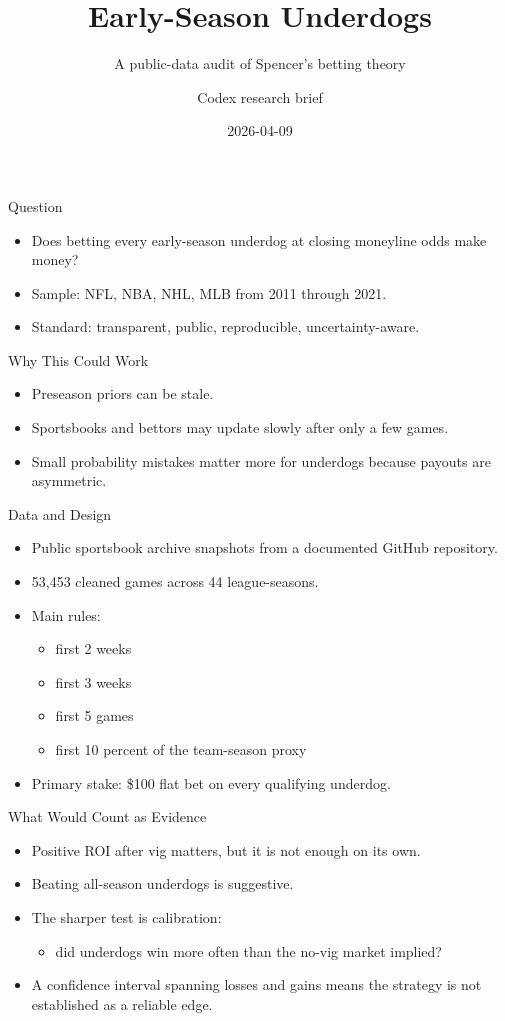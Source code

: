 \documentclass{beamer}
\title{Early-Season Underdogs}
\subtitle{A public-data audit of Spencer's betting theory}
\author{Codex research brief}
\date{2026-04-09}
\begin{document}
\begin{frame}
\titlepage
\end{frame}

\begin{frame}{Question}
\begin{itemize}
\item Does betting every early-season underdog at closing moneyline odds make money?
\item Sample: NFL, NBA, NHL, MLB from 2011 through 2021.
\item Standard: transparent, public, reproducible, uncertainty-aware.
\end{itemize}
\end{frame}

\begin{frame}{Why This Could Work}
\begin{itemize}
\item Preseason priors can be stale.
\item Sportsbooks and bettors may update slowly after only a few games.
\item Small probability mistakes matter more for underdogs because payouts are
asymmetric.
\end{itemize}
\end{frame}

\begin{frame}{Data and Design}
\begin{itemize}
\item Public sportsbook archive snapshots from a documented GitHub repository.
\item 53,453 cleaned games across 44 league-seasons.
\item Main rules:
\begin{itemize}
\item first 2 weeks
\item first 3 weeks
\item first 5 games
\item first 10 percent of the team-season proxy
\end{itemize}
\item Primary stake: \$100 flat bet on every qualifying underdog.
\end{itemize}
\end{frame}

\begin{frame}{What Would Count as Evidence}
\begin{itemize}
\item Positive ROI after vig matters, but it is not enough on its own.
\item Beating all-season underdogs is suggestive.
\item The sharper test is calibration:
\begin{itemize}
\item did underdogs win more often than the no-vig market implied?
\end{itemize}
\item A confidence interval spanning losses and gains means the strategy is not
established as a reliable edge.
\end{itemize}
\end{frame}
\end{document}
